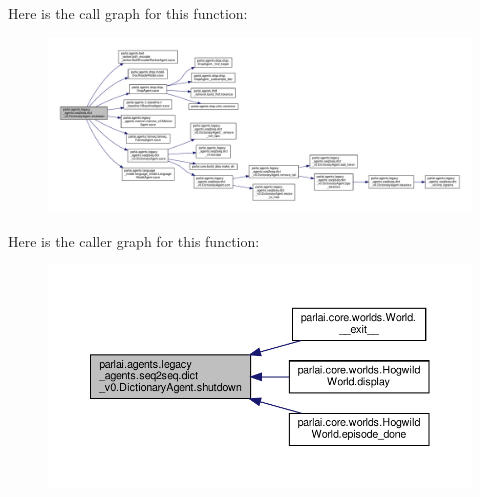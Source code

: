 Here is the call graph for this function\+:
\nopagebreak
\begin{figure}[H]
\begin{center}
\leavevmode
\includegraphics[width=350pt]{classparlai_1_1agents_1_1legacy__agents_1_1seq2seq_1_1dict__v0_1_1DictionaryAgent_acc5f2818eae15ab8ebe81924600bb6fe_cgraph}
\end{center}
\end{figure}
Here is the caller graph for this function\+:
\nopagebreak
\begin{figure}[H]
\begin{center}
\leavevmode
\includegraphics[width=350pt]{classparlai_1_1agents_1_1legacy__agents_1_1seq2seq_1_1dict__v0_1_1DictionaryAgent_acc5f2818eae15ab8ebe81924600bb6fe_icgraph}
\end{center}
\end{figure}
\mbox{\label{classparlai_1_1agents_1_1legacy__agents_1_1seq2seq_1_1dict__v0_1_1DictionaryAgent_a346cc45c8e6eba82cb76878445e843cf}} 
